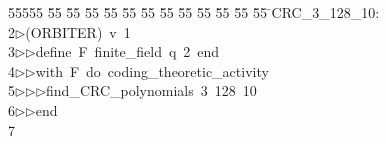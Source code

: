 %
%
\begin{tabbing}
55555 \= 55 \= 55 \= 55 \= 55 \= 55 \= 55 \= 55 \= 55 \= 55 \= 55 \= 55 \= 55 \= \>CRC\_3\_128\_10:\\[0pt]
2\>$\triangleright$\>(ORBITER)\ v\ 1\ \\[0pt]
3\>$\triangleright$\>$\triangleright$\>define\ F\ finite\_field\ q\ 2\ end\ \\[0pt]
4\>$\triangleright$\>$\triangleright$\>with\ F\ do\ coding\_theoretic\_activity\ \\[0pt]
5\>$\triangleright$\>$\triangleright$\>$\triangleright$\>find\_CRC\_polynomials\ 3\ 128\ 10\ \\[0pt]
6\>$\triangleright$\>$\triangleright$\>end\\[0pt]
7\>\end{tabbing}
